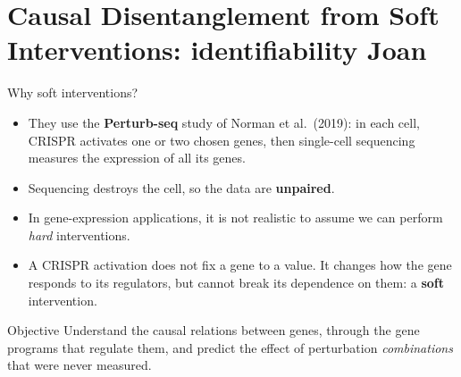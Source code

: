 \documentclass[11pt,aspectratio=169]{beamer}
\begin{document}
\section{Causal Disentanglement from Soft Interventions: identifiability \hfill {\normalsize Joan}}

\begin{frame}{Why soft interventions?}
	\begin{itemize}
		\item They use the \textbf{Perturb-seq} study of Norman et al.\ (2019): in each cell, CRISPR activates one or two chosen genes, then single-cell sequencing measures the expression of all its genes.
		\item Sequencing destroys the cell, so the data are \textbf{unpaired}.
		\item In gene-expression applications, it is not realistic to assume we can perform \emph{hard} interventions.
		\item A CRISPR activation does not fix a gene to a value. It changes how the gene responds to its regulators, but cannot break its dependence on them: a \textbf{soft} intervention.
	\end{itemize}
	\bigskip
	\begin{block}{Objective}
		Understand the causal relations between genes, through the gene programs that regulate them, and predict the effect of perturbation \emph{combinations} that were never measured.
	\end{block}
\end{frame}
\end{document}
